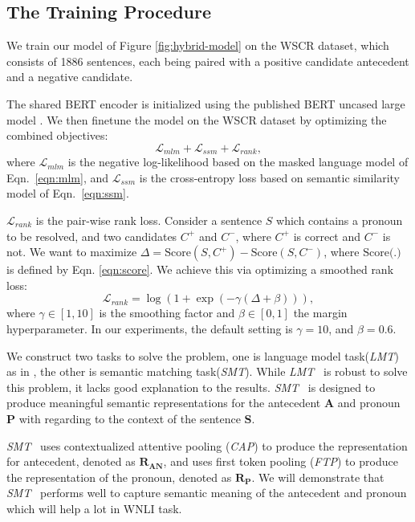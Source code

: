 \documentclass[11pt,a4paper]{article}
\newcommand{\lmt}{\textit{LMT}}
\newcommand{\smt}{\textit{SMT}}
\begin{document}
\subsection{The Training Procedure}

We train our model of Figure \ref{fig:hybrid-model} on the WSCR dataset, which consists of 1886 sentences, each being paired with a positive candidate antecedent and a negative candidate. 

The shared BERT encoder is initialized using the published BERT uncased large model \cite{devlin2018bert}. We then finetune the model on the WSCR dataset by optimizing the combined objectives:
\begin{equation}
\mathcal{L}_{mlm} + \mathcal{L}_{ssm} + \mathcal{L}_{rank},
\label{eqn:obj}
\end{equation}
where $\mathcal{L}_{mlm}$ is the negative log-likelihood based on the masked language model of Eqn.~\ref{eqn:mlm}, and $\mathcal{L}_{ssm}$ is the cross-entropy loss based on semantic similarity model of Eqn.~\ref{eqn:ssm}. 

$\mathcal{L}_{rank}$ is the pair-wise rank loss. 
Consider a sentence $S$ which contains a pronoun to be resolved, and two candidates $C^+$ and $C^-$, where $C^+$ is correct and $C^-$ is not. We want to maximize $\Delta = \text{Score}(S,C^+) - \text{Score}(S,C^-)$, where $\text{Score(.)}$ is defined by Eqn. \ref{eqn:score}. We achieve this via optimizing a smoothed rank loss:
\begin{equation}
\mathcal{L}_{rank} = \log (1 + \exp{(-\gamma (\Delta + \beta))}),
\label{eqn:maxm}
\end{equation}
where $\gamma \in [1, 10]$ is the smoothing factor and $\beta \in [0, 1]$ the margin hyperparameter. In our experiments, the default setting is $\gamma = 10$, and $\beta = 0.6$.

\iffalse
We construct two tasks to solve the problem, one is language model task(\lmt) as in \cite{kocijan2019surprisingly}, the other is semantic matching task(\smt). 
While \lmt~ is robust to solve this problem, it lacks good explanation to the results. \smt~ is designed to produce meaningful semantic representations for the antecedent $\mathbf{A}$ and pronoun $\mathbf{P}$ with regarding to the context of the sentence $\mathbf{S}$.

\smt~ uses contextualized attentive pooling (\textit{CAP}) to produce the representation for antecedent, denoted as $\mathbf{R_{AN}}$, and uses first token pooling (\textit{FTP}) to produce the representation of the pronoun, denoted as  $\mathbf{R_{P}}$. We will demonstrate that \smt~ performs well to capture semantic meaning of the antecedent and pronoun which will help a lot in WNLI task.
\end{document}
